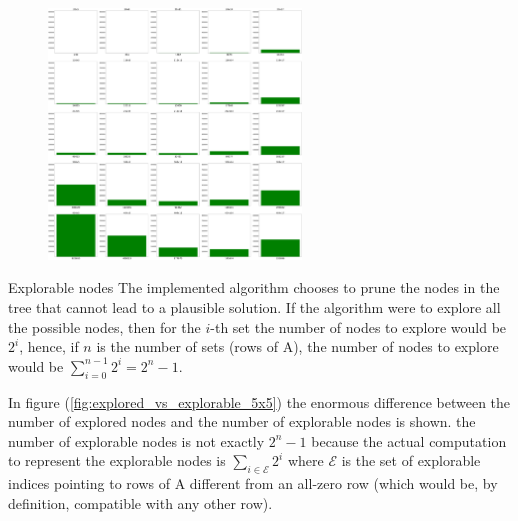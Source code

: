 \documentclass{beamer}
\begin{document}
\begin{frame}
    \begin{figure}
        \centering
        \includegraphics[width=0.6\textwidth]{explored_5x5.pdf}
        \label{fig:explored_5x5}
    \end{figure}
\end{frame}

\begin{frame}{Explorable nodes}
    The implemented algorithm chooses to prune the nodes in the tree
    that cannot lead to a plausible solution.
    If the algorithm were to explore all the possible nodes, then for the 
    $i$-th set the number of nodes to explore would be $2^i$,
    hence, if $n$ is the number of sets (rows of A),
    the number of nodes to explore would be $\sum_{i=0}^{n-1} 2^i = 2^n - 1$.

    In figure (\ref{fig:explored_vs_explorable_5x5}) the enormous difference
    between the number of explored nodes and the number of explorable nodes is shown.
    the number of explorable nodes is not exactly $2^n - 1$ because
    the actual computation to represent the explorable nodes is 
    $\sum_{i\in\mathcal{E}}2^i$ where $\mathcal{E}$ is the set of
    explorable  indices
    pointing to rows of A different from an all-zero row (which would be,
    by definition, compatible with any other row).
\end{frame}
\end{document}
